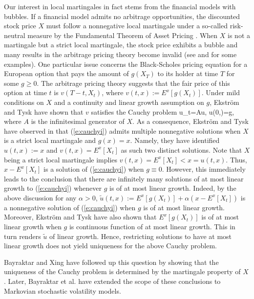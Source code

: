 \documentclass[11pt,reqno]{amsart}
\numberwithin{equation}{section}
\begin{document}
Our interest in local martingales in fact stems from the financial models with bubbles. If a financial model admits no arbitrage opportunities,  the discounted stock price $X$ must follow a nonnegative local martingale under a so-called risk-neutral measure by the Fundamental Theorem of Asset Pricing \cite{DS}. When $X$ is not a martingale but a strict local martingale, the stock price exhibits a bubble and many results in the arbitrage pricing theory become invalid (see \cite{CH} and \cite{PP} for some examples). One particular issue concerns the Black-Scholes pricing equation for a European option that pays the amount of $g(X_T)$ to its holder at time $T$ for some $g \geq 0$. The arbitrage pricing theory suggests that the fair price of this option at time $t$ is $v(T-t, X_t)$, where $v(t,x):=E^x[g(X_t)]$. Under mild conditions on $X$ and a continuity and linear growth assumption on $g$, Ekstr\"om and Tysk \cite{ET} have shown that $v$  satisfies the Cauchy problem
\be \label{e:cauchyi}
u_t=Au, \qquad u(0,\cdot)=g,
\ee
where $A$ is the infinitesimal generator of $X$. As a consequence, Ekstr\"om and Tysk have  observed in \cite{ET} that (\ref{e:cauchyi}) admits multiple nonnegative solutions when $X$ is a strict local martingale and $g(x)=x$. Namely, they have identified $u(t,x):=x$ and $v(t,x)=E^x[X_t]$ as such two distinct  solutions. Note that $X$ being a strict local martingale implies $v(t,x)=E^x[X_t]<x=u(t,x)$. Thus, $x-E^x[X_t]$ is a solution of (\ref{e:cauchyi}) when $g\equiv 0$.  However, this immediately leads to the conclusion that there are infinitely many solutions of at most linear growth to (\ref{e:cauchyi}) whenever $g$ is of at most linear growth. Indeed, by the above discussion  for any $\alpha >0$, $\tilde{u}(t,x):=E^x[g(X_t)] + \alpha (x-E^x[X_t])$ is a nonnegative solution of (\ref{e:cauchyi}) when $g$ is of at most linear growth. Moreover, Ekstr\"om and Tysk have also  shown that $E^x[g(X_t)]$ is of at most linear growth when $g$ is continuous function of at most linear growth.  This in turn renders $\tilde{u}$  of linear growth.  Hence, restricting solutions to have at most linear growth does not yield uniqueness for the above Cauchy problem.  

 Bayraktar and Xing \cite{BX} have followed up this question by showing that the uniqueness of the Cauchy problem is determined by the martingale property of $X$.  Later, Bayraktar et al. \cite{BKX} have extended the scope of these conclusions to Markovian stochastic volatility models. 
\end{document}
